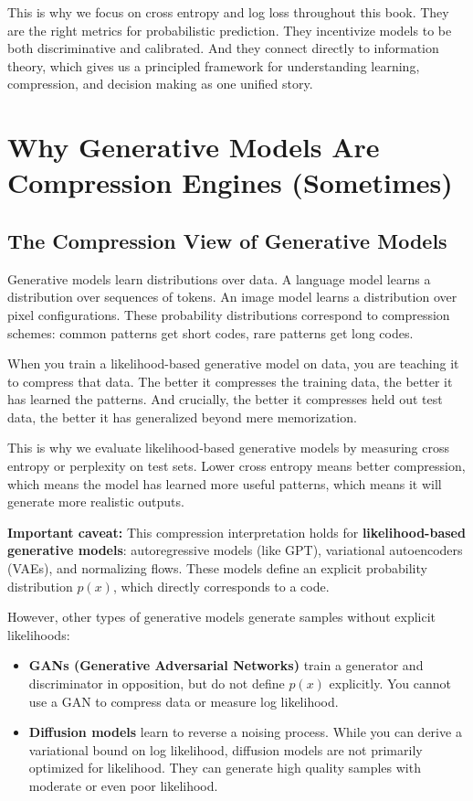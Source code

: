 This is why we focus on cross entropy and log loss throughout this book. They are the right metrics for probabilistic prediction. They incentivize models to be both discriminative and calibrated. And they connect directly to information theory, which gives us a principled framework for understanding learning, compression, and decision making as one unified story.

\vspace{2em}

\section{Why Generative Models Are Compression Engines (Sometimes)}

\subsection{The Compression View of Generative Models}

Generative models learn distributions over data. A language model learns a distribution over sequences of tokens. An image model learns a distribution over pixel configurations. These probability distributions correspond to compression schemes: common patterns get short codes, rare patterns get long codes.

When you train a likelihood-based generative model on data, you are teaching it to compress that data. The better it compresses the training data, the better it has learned the patterns. And crucially, the better it compresses held out test data, the better it has generalized beyond mere memorization.

This is why we evaluate likelihood-based generative models by measuring cross entropy or perplexity on test sets. Lower cross entropy means better compression, which means the model has learned more useful patterns, which means it will generate more realistic outputs.

\textbf{Important caveat:} This compression interpretation holds for \textbf{likelihood-based generative models}: autoregressive models (like GPT), variational autoencoders (VAEs), and normalizing flows. These models define an explicit probability distribution $p(x)$, which directly corresponds to a code.

However, other types of generative models generate samples without explicit likelihoods:

\begin{itemize}
\item \textbf{GANs (Generative Adversarial Networks)} train a generator and discriminator in opposition, but do not define $p(x)$ explicitly. You cannot use a GAN to compress data or measure log likelihood.

\item \textbf{Diffusion models} learn to reverse a noising process. While you can derive a variational bound on log likelihood, diffusion models are not primarily optimized for likelihood. They can generate high quality samples with moderate or even poor likelihood.
\end{itemize}

